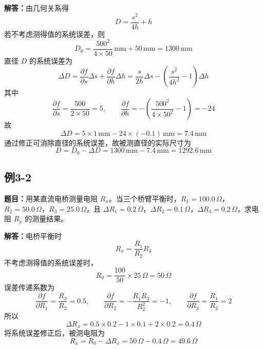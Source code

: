 \documentclass[UTF8,zihao=-4]{ctexart}
\newcommand{\problem}[1]{\subsection*{#1}}
\newcommand{\timu}{\noindent\textbf{题目：}}
\newcommand{\jieda}{\noindent\textbf{解答：}}
\begin{document}
\jieda 由几何关系得
\begin{equation*}
    D=\frac{s^2}{4h}+h
\end{equation*}
若不考虑测得值的系统误差，则
\begin{equation*}
    D_0=\frac{500^2}{4\times50}\,\mathrm{mm}+50\,\mathrm{mm}=1300\,\mathrm{mm}
\end{equation*}
直径 $D$ 的系统误差为
\begin{equation*}
    \Delta D=\frac{\partial f}{\partial s}\Delta s+\frac{\partial f}{\partial h}\Delta h
    =\frac{s}{2h}\Delta s-\left(\frac{s^2}{4h^2}-1\right)\Delta h
\end{equation*}
其中
\begin{equation*}
    \frac{\partial f}{\partial s}=\frac{500}{2\times50}=5,
    \qquad
    \frac{\partial f}{\partial h}=-\left(\frac{500^2}{4\times50^2}-1\right)=-24
\end{equation*}
故
\begin{equation*}
    \Delta D=5\times1\,\mathrm{mm}-24\times(-0.1)\,\mathrm{mm}=7.4\,\mathrm{mm}
\end{equation*}
通过修正可消除直径的系统误差，故被测直径的实际尺寸为
\begin{equation*}
    D=D_0-\Delta D=1300\,\mathrm{mm}-7.4\,\mathrm{mm}=1292.6\,\mathrm{mm}
\end{equation*}

\problem{例3-2}
\timu 用某直流电桥测量电阻 $R_x$。当三个桥臂平衡时，$R_1=100.0\,\Omega$，$R_2=50.0\,\Omega$，$R_3=25.0\,\Omega$，且 $\Delta R_1=0.2\,\Omega$，$\Delta R_2=0.1\,\Omega$，$\Delta R_3=0.2\,\Omega$，求电阻 $R_x$ 的测量结果。

\jieda 电桥平衡时
\begin{equation*}
    R_x=\frac{R_1}{R_2}R_3
\end{equation*}
不考虑测得值的系统误差时，
\begin{equation*}
    R_0=\frac{100}{50}\times25\,\Omega=50\,\Omega
\end{equation*}
误差传递系数为
\begin{equation*}
    \frac{\partial f}{\partial R_1}=\frac{R_3}{R_2}=0.5,
    \qquad
    \frac{\partial f}{\partial R_2}=-\frac{R_1R_3}{R_2^2}=-1,
    \qquad
    \frac{\partial f}{\partial R_3}=\frac{R_1}{R_2}=2
\end{equation*}
所以
\begin{equation*}
    \Delta R_x=0.5\times0.2-1\times0.1+2\times0.2=0.4\,\Omega
\end{equation*}
将系统误差修正后，被测电阻为
\begin{equation*}
    R_x=R_0-\Delta R_x=50\,\Omega-0.4\,\Omega=49.6\,\Omega
\end{equation*}
\end{document}
